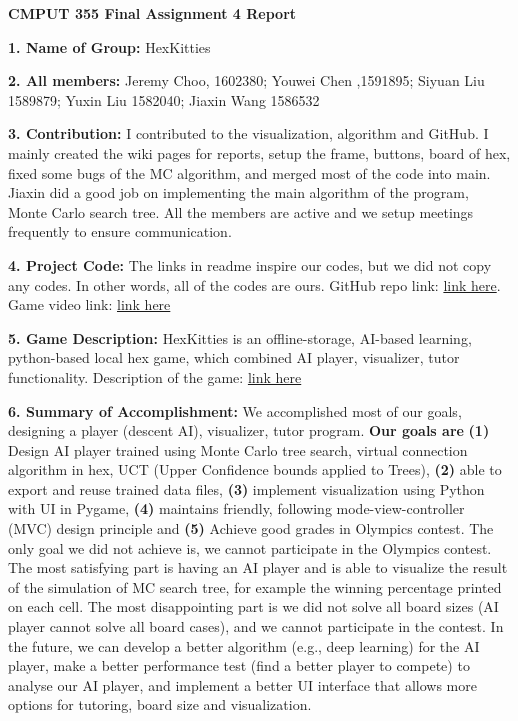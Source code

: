 \documentclass[12pt]{article}
\begin{document}
\begin{center}
\textbf{CMPUT 355	Final Assignment 4 Report}
 \end{center} 

\textbf{1. Name of Group:} HexKitties

\textbf{2. All members:} Jeremy Choo, 1602380; Youwei Chen ,1591895; Siyuan Liu 1589879; Yuxin Liu 1582040; Jiaxin Wang 1586532

\textbf{3. Contribution:} I contributed to the visualization, algorithm and GitHub. I mainly created the wiki pages for reports, setup the frame, buttons, board of hex, fixed some bugs of the MC algorithm, and merged most of the code into main. Jiaxin did a good job on implementing the main algorithm of the program, Monte Carlo search tree. All the members are active and we setup meetings frequently to ensure communication.

\textbf{4. Project Code:} The links in readme inspire our codes, but we did not copy any codes. In other words, all of the codes are ours. GitHub repo link: \href{https://github.com/HexKitties/CMPUT355HexKitties}{link here}. Game video link: \href{https://github.com/HexKitties/CMPUT355HexKitties/blob/main/HexDemo.mp4}{link here}

\textbf{5. Game Description:} HexKitties is an offline-storage, AI-based learning, python-based local hex game, which combined AI player, visualizer, tutor functionality. Description of the game: \href{http://www.mseymour.ca/hex_book/hexstrat.html}{link here}

\textbf{6. Summary of Accomplishment:} We accomplished most of our goals, designing a player (descent AI), visualizer, tutor program. \textbf{Our goals are} \textbf{(1)} Design AI player trained using Monte Carlo tree search, virtual connection algorithm in hex, UCT (Upper Confidence bounds applied to Trees), \textbf{(2)} able to export and reuse trained data files, \textbf{(3)} implement visualization using Python with UI in Pygame, \textbf{(4)} maintains friendly, following mode-view-controller (MVC) design principle and \textbf{(5)} Achieve good grades in Olympics contest. The only goal we did not achieve is, we cannot participate in the Olympics contest. The most satisfying part is having an AI player and is able to visualize the result of the simulation of MC search tree, for example the winning percentage printed on each cell. The most disappointing part is we did not solve all board sizes (AI player cannot solve all board cases), and we cannot participate in the contest. In the future, we can develop a better algorithm (e.g., deep learning) for the AI player, make a better performance test (find a better player to compete) to analyse our AI player, and implement a better UI interface that allows more options for tutoring, board size and visualization.
\end{document}
